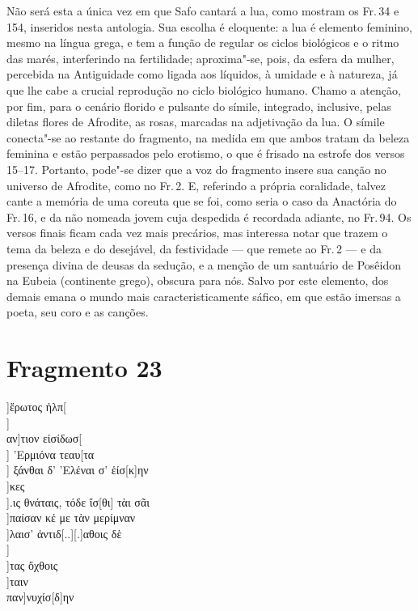 {Não será esta a única vez em que Safo cantará a lua,
como mostram os Fr.\,34 e 154, inseridos nesta antologia. Sua escolha é
eloquente: a lua é elemento feminino, mesmo na língua grega, e tem a função de
regular os ciclos biológicos e o ritmo das marés, interferindo na fertilidade;
aproxima"-se, pois, da esfera da mulher, percebida na Antiguidade como ligada
aos líquidos, à umidade e à natureza, já que lhe cabe a crucial
reprodução no ciclo biológico humano. Chamo a atenção, por fim, para o cenário
florido e pulsante do símile, integrado, inclusive, pelas diletas flores de
Afrodite, as rosas, marcadas na adjetivação da lua. O símile conecta"-se
ao restante do fragmento, na medida em que ambos tratam da beleza feminina e
estão perpassados pelo erotismo, o que é frisado na estrofe dos versos 15--17.
Portanto, pode"-se dizer que a voz do fragmento insere sua canção no universo de
Afrodite, como no Fr.\,2.
E, referindo a própria coralidade, talvez cante a memória de uma coreuta que se foi, como seria o caso da Anactória do Fr.\,16, e da não nomeada jovem cuja despedida é recordada adiante, no Fr.\,94.
Os versos finais ficam cada vez mais precários, mas interessa notar que trazem o tema da beleza e do desejável, da festividade --- que remete ao Fr.\,2 --- e da presença divina de deusas da sedução, e a menção de um santuário de Posêidon na Eubeia (continente grego), obscura para nós. Salvo por este elemento, dos demais emana o mundo mais caracteristicamente sáfico, em que estão imersas a poeta, seu coro e as canções.}


\section{Fragmento 23}

\begin{gkverse}
]ἕρωτος  ἠλπ[\\
		       ]\\
		   αν]τιον εἰσίδωσ[\\
		       ] ’Ερμιόνα τεαυ[τα\\
	   ] ξάνθαι δ’ ’Ελέναι σ’ ἑίσ[κ]ην\\
	]κες \\
	].ις θνάταις, τόδε ἴσ[θι] τὰι σᾶι\\
	]παίσαν κέ με τὰν μερίμναν\\
	]λαισ’ ἀντιδ[..][.]αθοις δὲ\\
     ]\\
				]τας ὄχθοις\\
			          ]ταιν\\
			      παν]νυχίσ[δ]ην
\end{gkverse}


